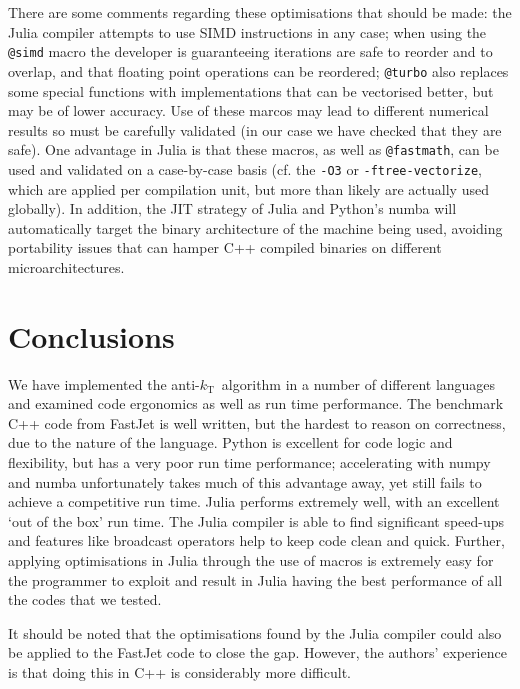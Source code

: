 \documentclass{webofc}
\newcommand{\akt}{anti-${k}_\text{T}$}
\begin{document}
There are some comments regarding these optimisations that should be made: the
Julia compiler attempts to use SIMD instructions in any case; when using the
\texttt{@simd} macro the developer is guaranteeing iterations are safe to
reorder and to overlap, and that floating point operations can be reordered;
\texttt{@turbo} also replaces some special functions with implementations that
can be vectorised better, but may be of lower accuracy. Use of these marcos may
lead to different numerical results so must be carefully validated (in our case
we have checked that they are safe). One advantage in Julia is that these
macros, as well as \texttt{@fastmath}, can be used and validated on a
case-by-case basis (cf. the \texttt{-O3} or \texttt{-ftree-vectorize}, which are
applied per compilation unit, but more than likely are actually used globally). In
addition, the JIT strategy of Julia and Python's numba will automatically target
the binary architecture of the machine being used, avoiding portability issues
that can hamper C++ compiled binaries on different microarchitectures.

\section{Conclusions}
\label{sec:conclusions}

We have implemented the \akt\ algorithm in a number of different languages
and examined code ergonomics as well as run time performance. The benchmark C++
code from FastJet is well written, but the hardest to reason on correctness, due
to the nature of the language. Python is excellent for code logic and
flexibility, but has a very poor run time performance; accelerating with numpy
and numba unfortunately takes much of this advantage away, yet still fails to
achieve a competitive run time. Julia performs extremely well, with an excellent
`out of the box' run time. The Julia compiler is able to find significant
speed-ups and features like broadcast operators help to keep code clean and
quick. Further, applying optimisations in Julia through the use of macros is
extremely easy for the programmer to exploit and result in Julia having the best
performance of all the codes that we tested.

It should be noted that the optimisations found by the Julia compiler could also
be applied to the FastJet code to close the gap. However, the authors'
experience is that doing this in C++ is considerably more difficult.
\end{document}
